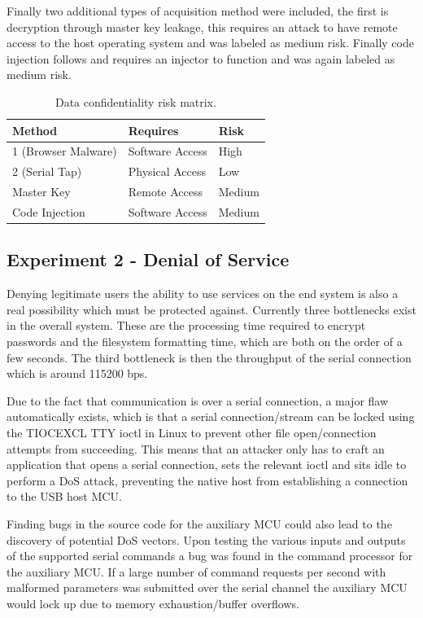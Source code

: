 Finally two additional types of acquisition method were included, the first is decryption through master key leakage, this requires an attack to have remote access to the host operating system and was labeled as medium risk. Finally code injection follows and requires an injector to function and was again labeled as medium risk.
\begin{table}[H]
\centering
\begin{tabular}{|l|l|l|}
\hline
Method              & Requires        & Risk   \\ \hline
1 (Browser Malware) & Software Access & High   \\ \hline
2 (Serial Tap)      & Physical Access & Low    \\ \hline
Master Key          & Remote Access   & Medium \\ \hline
Code Injection      & Software Access & Medium \\ \hline
\end{tabular}
\caption{Data confidentiality risk matrix.}
\end{table}

\subsection{Experiment 2 - Denial of Service}
Denying legitimate users the ability to use services on the end system is also a real possibility which must be protected against. Currently three bottlenecks exist in the overall system. These are the processing time required to encrypt passwords and the filesystem formatting time, which are both on the order of a few seconds. The third bottleneck is then the throughput of the serial connection which is around 115200 bps.

Due to the fact that communication is over a serial connection, a major flaw automatically exists, which is that a serial connection/stream can be locked using the TIOCEXCL TTY ioctl in Linux to prevent other file open/connection attempts from succeeding. This means that an attacker only has to craft an application that opens a serial connection, sets the relevant ioctl and sits idle to perform a DoS attack, preventing the native host from establishing a connection to the USB host MCU.

Finding bugs in the source code for the auxiliary MCU could also lead to the discovery of potential DoS vectors. Upon testing the various inputs and outputs of the supported serial commands a bug was found in the command processor for the auxiliary MCU. If a large number of command requests per second with malformed parameters was submitted over the serial channel the auxiliary MCU would lock up due to memory exhaustion/buffer overflows.

